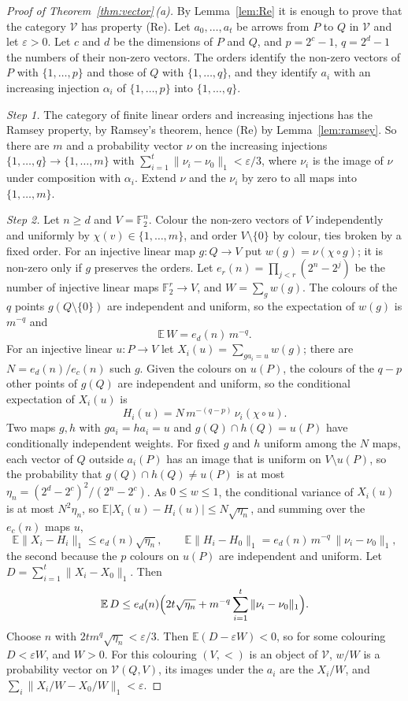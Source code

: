 \documentclass[11pt,a4paper]{article}
\theoremstyle{definition}
\newcommand{\V}{\mathcal{V}}
\newcommand{\F}{\mathbb{F}}
\begin{document}
\begin{proof}[Proof of Theorem~\ref{thm:vector}\,\textup{(a)}]
By Lemma~\ref{lem:Re} it is enough to prove that the category $\V$ has
property \textup{(Re)}. Let $a_0,\dots,a_t$ be arrows from $P$ to $Q$ in
$\V$ and let $\varepsilon>0$. Let $c$ and $d$
be the dimensions of $P$ and $Q$, and $p=2^c-1$, $q=2^d-1$ the numbers of
their non-zero vectors. The orders identify the non-zero vectors of $P$
with $\{1,\dots,p\}$ and those of $Q$ with $\{1,\dots,q\}$, and they
identify $a_i$ with an increasing injection $\alpha_i$ of
$\{1,\dots,p\}$ into $\{1,\dots,q\}$.

\emph{Step 1.} The category of finite linear orders and increasing
injections has the Ramsey property, by Ramsey's theorem, hence
\textup{(Re)} by Lemma~\ref{lem:ramsey}. So there are $m$ and a probability
vector $\nu$ on the increasing injections
$\{1,\dots,q\}\to\{1,\dots,m\}$ with
$\sum_{i=1}^t\|\nu_i-\nu_0\|_1<\varepsilon/3$, where $\nu_i$ is the image
of $\nu$ under composition with $\alpha_i$. Extend $\nu$ and the $\nu_i$ by
zero to all maps into $\{1,\dots,m\}$.

\emph{Step 2.} Let $n\ge d$ and $V=\F_2^n$. Colour the non-zero vectors of
$V$ independently and uniformly by $\chi(v)\in\{1,\dots,m\}$, and order
$V\setminus\{0\}$ by colour, ties broken by a fixed order. For an injective
linear map $g\colon Q\to V$ put $w(g)=\nu(\chi\circ g)$; it is non-zero only
if $g$ preserves the orders. Let $e_r(n)=\prod_{j<r}(2^n-2^j)$ be the
number of injective linear maps $\F_2^r\to V$, and $W=\sum_gw(g)$. The
colours of the $q$ points $g(Q\setminus\{0\})$ are independent and uniform,
so the expectation of $w(g)$ is $m^{-q}$ and
\[
 \mathbb{E}\,W=e_d(n)\,m^{-q}.
\]
For an injective linear $u\colon P\to V$ let
$X_i(u)=\sum_{ga_i=u}w(g)$; there are $N=e_d(n)/e_c(n)$ such $g$. Given the
colours on $u(P)$, the colours of the $q-p$ other points of $g(Q)$ are
independent and uniform, so the conditional expectation of $X_i(u)$ is
\[
 H_i(u)=N\,m^{-(q-p)}\,\nu_i(\chi\circ u).
\]
Two maps $g,h$ with $ga_i=ha_i=u$ and $g(Q)\cap h(Q)=u(P)$ have
conditionally independent weights. For fixed $g$ and $h$ uniform among the
$N$ maps, each vector of $Q$ outside $a_i(P)$ has an image that is uniform
on $V\setminus u(P)$, so the probability that $g(Q)\cap h(Q)\ne u(P)$ is at
most $\eta_n=(2^d-2^c)^2/(2^n-2^c)$. As $0\le w\le1$, the conditional
variance of $X_i(u)$ is at most $N^2\eta_n$, so
$\mathbb{E}|X_i(u)-H_i(u)|\le N\sqrt{\eta_n}$, and summing over the
$e_c(n)$ maps $u$,
\[
 \mathbb{E}\|X_i-H_i\|_1\le e_d(n)\sqrt{\eta_n},\qquad
 \mathbb{E}\|H_i-H_0\|_1=e_d(n)\,m^{-q}\,\|\nu_i-\nu_0\|_1 ,
\]
the second because the $p$ colours on $u(P)$ are independent and uniform.
Let $D=\sum_{i=1}^t\|X_i-X_0\|_1$. Then
\[
 \mathbb{E}\,D\le e_d(n)\Bigl(2t\sqrt{\eta_n}
 +m^{-q}\sum_{i=1}^t\|\nu_i-\nu_0\|_1\Bigr).
\]
Choose $n$ with $2tm^q\sqrt{\eta_n}<\varepsilon/3$. Then
$\mathbb{E}(D-\varepsilon W)<0$, so for some colouring $D<\varepsilon W$,
and $W>0$. For this colouring $(V,<)$ is an object of $\V$, $w/W$ is a
probability vector on $\V(Q,V)$, its images under the $a_i$ are the
$X_i/W$, and $\sum_i\|X_i/W-X_0/W\|_1<\varepsilon$.
\end{proof}
\end{document}
